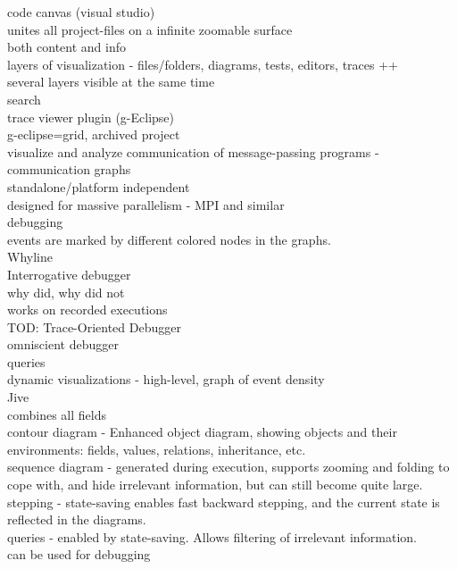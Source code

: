 code canvas (visual studio)\\%
	unites all project-files on a infinite zoomable surface\\
	both content and info\\
	layers of visualization - files/folders, diagrams, tests, editors, traces ++\\
	several layers visible at the same time\\
	search\\

trace viewer plugin (g-Eclipse)\\%
	g-eclipse=grid, archived project\\
	visualize and analyze communication of message-passing programs - communication graphs\\
	standalone/platform independent\\
	designed for massive parallelism - MPI and similar\\
	debugging\\
	events are marked by different colored nodes in the graphs.\\

Whyline\\%
	Interrogative debugger\\
	why did, why did not\\
	works on recorded executions\\

TOD: Trace-Oriented Debugger\\%
	omniscient debugger\\
	queries\\
	dynamic visualizations - high-level, graph of event density\\

Jive\\%
	combines all fields\\
	contour diagram - Enhanced object diagram, showing objects and their environments: fields, values, relations, inheritance, etc.\\
	sequence diagram - generated during execution, supports zooming and folding to cope with, and hide irrelevant information, but can still become quite large.\\
	stepping - state-saving enables fast backward stepping, and the current state is reflected in the diagrams.\\
	queries - enabled by state-saving. Allows filtering of irrelevant information.\\
	can be used for debugging\\




